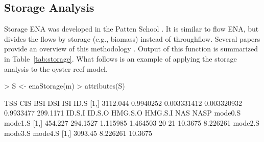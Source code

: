 \documentclass[article]{jss}
\begin{document}
\subsection{Storage Analysis}

Storage ENA was developed in the Patten School
\citep{barber1978retrospective, barber1978markovian}.  It is similar
to flow ENA, but divides the flows by storage (e.g., biomass) instead
of throughflow.  Several papers provide an overview of this
methodology \cite{fath99_review, gattie06, schramski11}.  Output of
this function is summarized in Table~\ref{tab:storage}. What follows
is an example of applying the storage analysis to the oyster reef
model.

\begin{Schunk}
\begin{Sinput}
> S <- enaStorage(m)
> attributes(S)
\end{Sinput}
\begin{Soutput}
          TSS       CIS         BSI         DSI       ISI     ID.S
[1,] 3112.044 0.9940252 0.003331412 0.003320932 0.9933477 299.1171
      ID.S.I   ID.S.O  HMG.S.O  HMG.S.I NAS NASP mode0.S  mode1.S
[1,] 454.227 294.1527 1.115985 1.464503  20   21 10.3675 8.226261
     mode2.S  mode3.S mode4.S
[1,] 3093.45 8.226261 10.3675
\end{Soutput}
\end{Schunk}
\end{document}

